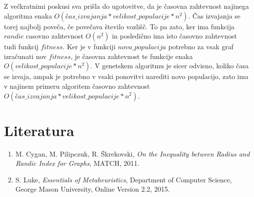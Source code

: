 \documentclass[a4paper, 10pt]{article}
\begin{document}
Z večkratnimi poskusi sva prišla do ugotovitve, da je časovna zahtevnost najinega algoritma enaka $O(čas\_izvajanja * velikost\_populacije * n^2)$.  Čas izvajanja se torej najbolj poveča, če povečava število vozlišč. To pa zato, ker ima funkcija $randic$ casovno zahtevnost $O(n^2)$ in posledično ima isto časovno zahtevnost tudi funkcij $fitness$.  Ker je v funkciji $nova\_populacija$ potrebno za vsak graf izračunati nov $fitness$, je časovna zahtevnost te funkcije enaka $O(velikost\_populacije * n^2)$. V genetskem algoritmu je sicer odvisno, koliko časa se izvaja, ampak  je potrebno v vsaki ponovitvi narediti novo populacijo, zato ima v najinem primeru algoritem časovno zahtevnost $O(čas\_izvajanja * velikost\_populacije * n^2)$.

\pagebreak

\section{Literatura}
\vspace{0.5cm}

\renewcommand{\labelenumi}{[\arabic{enumi}]}
\begin{enumerate}
\item \noindent M. Cygan, M. Pilipczuk, R. Škrekovski, \textsl{On the Inequality between Radius and Randic Index for Graphs}, MATCH, 2011. 
\vspace{0.5cm}
\item \noindent  S. Luke, \textsl{Essentials of Metaheuristics}, Department of Computer Science, George Mason University, Online Version 2.2, 2015.
\end{enumerate}
\end{document}
